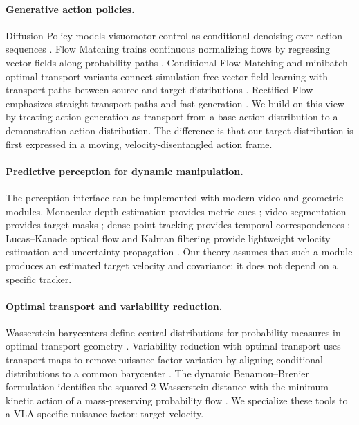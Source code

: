 \documentclass[10pt,twocolumn,letterpaper]{article}
\begin{document}
\paragraph{Generative action policies.}
Diffusion Policy models visuomotor control as conditional denoising over action sequences \citep{chi2023diffusionpolicy}. Flow Matching trains continuous normalizing flows by regressing vector fields along probability paths \citep{lipman2023flow}. Conditional Flow Matching and minibatch optimal-transport variants connect simulation-free vector-field learning with transport paths between source and target distributions \citep{tong2024improving}. Rectified Flow emphasizes straight transport paths and fast generation \citep{liu2023rectified}. We build on this view by treating action generation as transport from a base action distribution to a demonstration action distribution. The difference is that our target distribution is first expressed in a moving, velocity-disentangled action frame.

\paragraph{Predictive perception for dynamic manipulation.}
The perception interface can be implemented with modern video and geometric modules. Monocular depth estimation provides metric cues \citep{yang2024depthanythingv2}; video segmentation provides target masks \citep{ravi2024sam2}; dense point tracking provides temporal correspondences \citep{karaev2024cotracker}; Lucas--Kanade optical flow and Kalman filtering provide lightweight velocity estimation and uncertainty propagation \citep{lucas1981iterative,kalman1960filtering}. Our theory assumes that such a module produces an estimated target velocity and covariance; it does not depend on a specific tracker.

\paragraph{Optimal transport and variability reduction.}
Wasserstein barycenters define central distributions for probability measures in optimal-transport geometry \citep{agueh2011barycenters,villani2009optimal,peyre2019computational}. Variability reduction with optimal transport uses transport maps to remove nuisance-factor variation by aligning conditional distributions to a common barycenter \citep{hung2022variability}. The dynamic Benamou--Brenier formulation identifies the squared $2$-Wasserstein distance with the minimum kinetic action of a mass-preserving probability flow \citep{benamou2000computational,ambrosio2008gradient}. We specialize these tools to a VLA-specific nuisance factor: target velocity.
\end{document}
